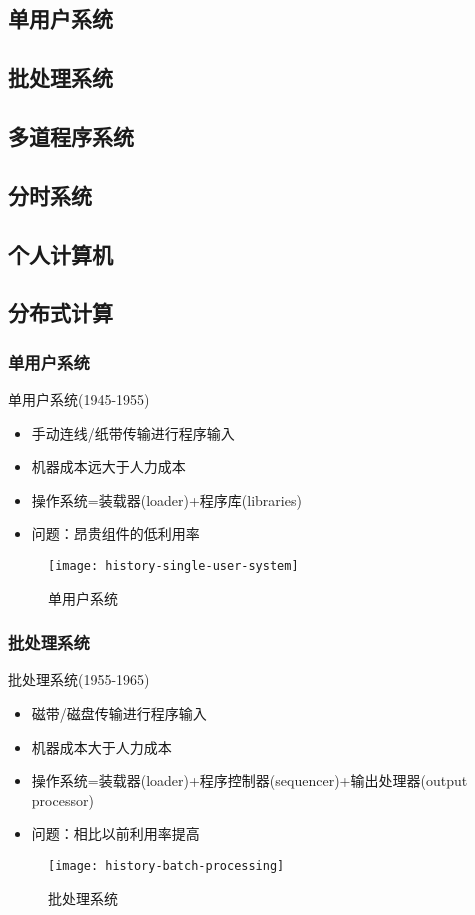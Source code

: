 \subsection{单用户系统}
\subsection{批处理系统}
\subsection{多道程序系统}
\subsection{分时系统}
\subsection{个人计算机}
\subsection{分布式计算}

\begin{frame}[plain]

\frametitle{单用户系统}

单用户系统(1945-1955)
\begin{itemize}
\item 手动连线/纸带传输进行程序输入
\item 机器成本远大于人力成本	
\item 操作系统=装载器(loader)+程序库(libraries) 
\item 问题：昂贵组件的低利用率
\end{itemize}

	\begin{figure}
	\centering
	\texttt{[image: history-single-user-system]}
	\caption{单用户系统}
\end{figure}

\end{frame}



\begin{frame}[plain]
	
	\frametitle{批处理系统}
	
	批处理系统(1955-1965)
	\begin{itemize}
		\item 磁带/磁盘传输进行程序输入
		\item 机器成本大于人力成本	
		\item 操作系统=装载器(loader)+程序控制器(sequencer)+输出处理器(output processor)
		\item 问题：相比以前利用率提高
	\end{itemize}
	
	\begin{figure}
		\centering
		\texttt{[image: history-batch-processing]}
		\caption{批处理系统}
	\end{figure}
	
\end{frame}

